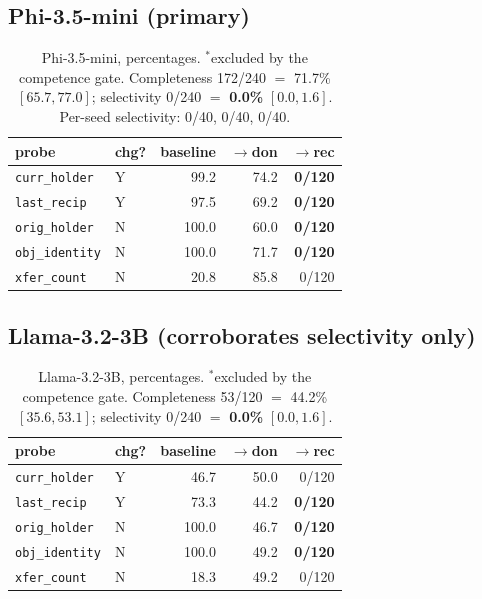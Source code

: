 \documentclass[11pt]{article}
\begin{document}
\subsection{Phi-3.5-mini (primary)}
\label{sec:phi}

\begin{table}[t]
  \centering\small
  \setlength{\tabcolsep}{4pt}
  \begin{tabular}{llrrr}
    \toprule
    probe & chg? & baseline & $\rightarrow$don & $\rightarrow$rec \\
    \midrule
    \texttt{curr\_holder} & Y & 99.2 & 74.2 & \textbf{0/120} \\
    \texttt{last\_recip}  & Y & 97.5 & 69.2 & \textbf{0/120} \\
    \texttt{orig\_holder} & N & 100.0 & 60.0 & \textbf{0/120} \\
    \texttt{obj\_identity}& N & 100.0 & 71.7 & \textbf{0/120} \\
    \texttt{xfer\_count}  & N & 20.8\rlap{$^\ast$} & 85.8 & 0/120 \\
    \bottomrule
  \end{tabular}
  \caption{Phi-3.5-mini, percentages. $^\ast$excluded by the competence gate.
    Completeness 172/240 $=$ 71.7\% $[65.7, 77.0]$; selectivity 0/240 $=$
    \textbf{0.0\%} $[0.0, 1.6]$. Per-seed selectivity: 0/40, 0/40, 0/40.}
  \label{tab:phi}
\end{table}

\subsection{Llama-3.2-3B (corroborates selectivity only)}
\label{sec:llama}

\begin{table}[t]
  \centering\small
  \setlength{\tabcolsep}{4pt}
  \begin{tabular}{llrrr}
    \toprule
    probe & chg? & baseline & $\rightarrow$don & $\rightarrow$rec \\
    \midrule
    \texttt{curr\_holder} & Y & 46.7\rlap{$^\ast$} & 50.0 & 0/120 \\
    \texttt{last\_recip}  & Y & 73.3 & 44.2 & \textbf{0/120} \\
    \texttt{orig\_holder} & N & 100.0 & 46.7 & \textbf{0/120} \\
    \texttt{obj\_identity}& N & 100.0 & 49.2 & \textbf{0/120} \\
    \texttt{xfer\_count}  & N & 18.3\rlap{$^\ast$} & 49.2 & 0/120 \\
    \bottomrule
  \end{tabular}
  \caption{Llama-3.2-3B, percentages. $^\ast$excluded by the competence gate.
    Completeness 53/120 $=$ 44.2\% $[35.6, 53.1]$; selectivity 0/240 $=$
    \textbf{0.0\%} $[0.0, 1.6]$.}
  \label{tab:llama}
\end{table}
\end{document}
